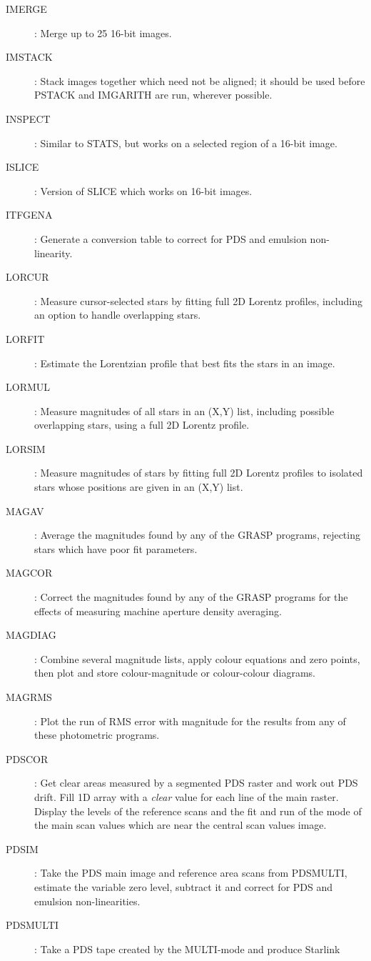 \begin{description}
\item [IMERGE]: Merge up to 25 16-bit images.
\item [IMSTACK]: Stack images together which need not be aligned; it should be
used before PSTACK and IMGARITH are run, wherever possible.
\item [INSPECT]: Similar to STATS, but works on a selected region of a 16-bit
image.
\item [ISLICE]: Version of SLICE which works on 16-bit images.
\item [ITFGENA]: Generate a conversion table to correct for PDS and emulsion
non-linearity.
\item [LORCUR]: Measure cursor-selected stars by fitting full 2D Lorentz
profiles, including an option to handle overlapping stars.
\item [LORFIT]: Estimate the Lorentzian profile that best fits the stars in an
image.
\item [LORMUL]: Measure magnitudes of all stars in an (X,Y) list, including
possible overlapping stars, using a full 2D Lorentz profile.
\item [LORSIM]: Measure magnitudes of stars by fitting full 2D Lorentz profiles
to isolated stars whose positions are given in an (X,Y) list.
\item [MAGAV]: Average the magnitudes found by any of the GRASP programs,
rejecting stars which have poor fit parameters.
\item [MAGCOR]: Correct the magnitudes found by any of the GRASP programs for
the effects of measuring machine aperture density averaging.
\item [MAGDIAG]: Combine several magnitude lists, apply colour equations and
zero points, then plot and store colour-magnitude or colour-colour diagrams.
\item [MAGRMS]: Plot the run of RMS error with magnitude for the results from
any of these photometric programs.
\item [PDSCOR]: Get clear areas measured by a segmented PDS raster and work
out PDS drift.
Fill 1D array with a {\em clear} value for each line of the main raster.
Display the levels of the reference scans and the fit and run of the mode of
the main scan values which are near the central scan values image.
\item [PDSIM]: Take the PDS main image and reference area scans from PDSMULTI,
estimate the variable zero level, subtract it and correct for PDS and emulsion
non-linearities.
\item [PDSMULTI]: Take a PDS tape created by the MULTI-mode and produce Starlink

\end{description}
